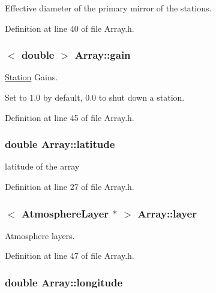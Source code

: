 Effective diameter of the primary mirror of the stations. 



Definition at line 40 of file Array.h.

\hypertarget{classArray_ace0fa383a1da1684b91e268beaf41ece}{
\subsubsection[{gain}]{$<$ double $>$ {\bf Array::gain}}}
\label{classArray_ace0fa383a1da1684b91e268beaf41ece}


\hyperlink{classStation}{Station} Gains. 

Set to 1.0 by default, 0.0 to shut down a station. 

Definition at line 45 of file Array.h.

\hypertarget{classArray_a3d0a097d6c7d27ab0ba7b72a9b2223e1}{
\subsubsection[{latitude}]{\setlength{\rightskip}{0pt plus 5cm}double {\bf Array::latitude}}}
\label{classArray_a3d0a097d6c7d27ab0ba7b72a9b2223e1}


latitude of the array 



Definition at line 27 of file Array.h.

\hypertarget{classArray_a8b777c1aa4eac3ce7687da64da7cc958}{
\subsubsection[{layer}]{$<$ {\bf AtmosphereLayer} $\ast$ $>$ {\bf Array::layer}}}
\label{classArray_a8b777c1aa4eac3ce7687da64da7cc958}


Atmosphere layers. 



Definition at line 47 of file Array.h.

\hypertarget{classArray_a7b0af12d6151bd9bb25e91145b79fb74}{
\subsubsection[{longitude}]{\setlength{\rightskip}{0pt plus 5cm}double {\bf Array::longitude}}}
\label{classArray_a7b0af12d6151bd9bb25e91145b79fb74}


